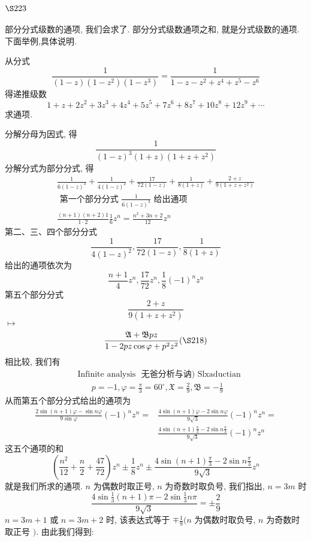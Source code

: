 \section{$\S 223$}

部分分式级数的通项, 我们会求了. 部分分式级数通项之和, 就是分式级数的通项. 下面举例,具体说明.

从分式
\[
\frac{1}{(1-z)\left(1-z^{2}\right)\left(1-z^{3}\right)}=\frac{1}{1-z-z^{2}+z^{4}+z^{5}-z^{6}}
\]
得递推级数
\[
1+z+2 z^{2}+3 z^{3}+4 z^{4}+5 z^{5}+7 z^{6}+8 z^{7}+10 z^{8}+12 z^{9}+\cdots
\]
求通项.

分解分母为因式, 得
\[
\frac{1}{(1-z)^{3}(1+z)\left(1+z+z^{2}\right)}
\]
分解分式为部分分式, 得
\[
\begin{gathered}
\frac{1}{6(1-z)^{3}}+\frac{1}{4(1-z)^{2}}+\frac{17}{72(1-z)}+\frac{1}{8(1+z)}+\frac{2+z}{9\left(1+z+z^{2}\right)} \\
\text { 第一个部分分式 } \frac{1}{6(1-z)^{3}} \text { 给出通项 } \\
\frac{(n+1)(n+2) 1}{1 \cdot 2} \frac{1}{6} z^{n}=\frac{n^{2}+3 n+2}{12} z^{n}
\end{gathered}
\]
第二、三、四个部分分式
\[
\frac{1}{4(1-z)^{2}}, \frac{17}{72(1-z)}, \frac{1}{8(1+z)}
\]
给出的通项依次为
\[
\frac{n+1}{4} z^{n}, \frac{17}{72} z^{n}, \frac{1}{8}(-1)^{n} z^{n}
\]
第五个部分分式
\[
\frac{2+z}{9\left(1+z+z^{2}\right)}
\]
$\mapsto$
\[
\frac{\mathfrak{A}+\mathfrak{B} p z}{1-2 p z \cos \varphi+p^{2} z^{2}}(\S 218)
\]
相比较, 我们有 
\[
\begin{aligned}
& \text { Infinite analysis } \text { 无爸分析与讷) Slxaductian } \\
& \qquad p=-1, \varphi=\frac{\pi}{3}=60^{\circ}, \mathfrak{X}=\frac{2}{9}, \mathfrak{B}=-\frac{1}{9}
\end{aligned}
\]
从而第五个部分分式给出的通项为
\[
\begin{aligned}
\frac{2 \sin (n+1) \varphi-\sin n \varphi}{9 \sin \varphi}(-1)^{n} z^{n}= & \frac{4 \sin (n+1) \varphi-2 \sin n \varphi}{9 \sqrt{3}}(-1)^{n} z^{n}= \\
& \frac{4 \sin (n+1) \frac{\pi}{3}-2 \sin n \frac{\pi}{3}}{9 \sqrt{3}}(-1)^{n} z^{n}
\end{aligned}
\]
这五个通项的和
\[
\left(\frac{n^{2}}{12}+\frac{n}{2}+\frac{47}{72}\right) z^{n} \pm \frac{1}{8} z^{n} \pm \frac{4 \sin (n+1) \frac{\pi}{3}-2 \sin n \frac{\pi}{3}}{9 \sqrt{3}} z^{n}
\]
就是我们所求的通项. $n$ 为偶数时取正号, $n$ 为奇数时取负号, 我们指出, $n=3 m$ 时
\[
\frac{4 \sin \frac{1}{3}(n+1) \pi-2 \sin \frac{1}{3} n \pi}{9 \sqrt{3}}=\pm \frac{2}{9}
\]
$n=3 m+1$ 或 $n=3 m+2$ 时, 该表达式等于 $\mp \frac{1}{9}(n$ 为偶数时取负号, $n$ 为奇数时取正号 $)$. 由此我们得到:

